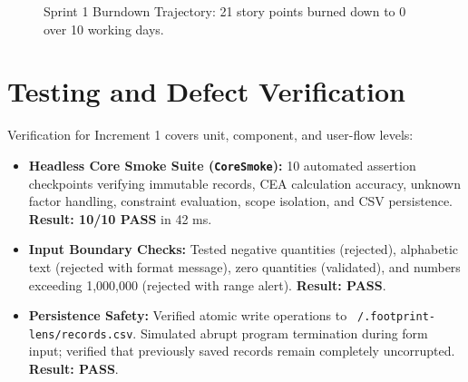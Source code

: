 \documentclass[12pt,a4paper]{article}
\newcommand{\code}[1]{\texttt{#1}}
\begin{document}
\begin{figure}[h!]
\centering
{}
\caption{Sprint 1 Burndown Trajectory: 21 story points burned down to 0 over 10 working days.}
\label{fig:burndown}
\end{figure}

\section{Testing and Defect Verification}

Verification for Increment 1 covers unit, component, and user-flow levels:
\begin{itemize}[leftmargin=*]
  \item \textbf{Headless Core Smoke Suite (\code{CoreSmoke}):} 10 automated assertion checkpoints verifying immutable records, CEA calculation accuracy, unknown factor handling, constraint evaluation, scope isolation, and CSV persistence. \textbf{Result: 10/10 PASS} in 42 ms.
  \item \textbf{Input Boundary Checks:} Tested negative quantities (rejected), alphabetic text (rejected with format message), zero quantities (validated), and numbers exceeding 1,000,000 (rejected with range alert). \textbf{Result: PASS}.
  \item \textbf{Persistence Safety:} Verified atomic write operations to \code{~/.footprint-lens/records.csv}. Simulated abrupt program termination during form input; verified that previously saved records remain completely uncorrupted. \textbf{Result: PASS}.
\end{itemize}
\end{document}
